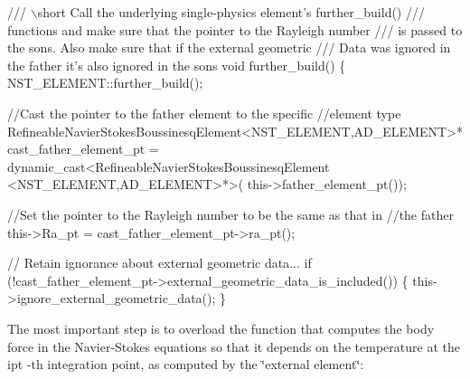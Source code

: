 \begin{DoxyCodeInclude}
  \textcolor{comment}{}
\textcolor{comment}{  /// \(\backslash\)short Call the underlying single-physics element's further\_build()}
\textcolor{comment}{  /// functions and make sure that the pointer to the Rayleigh number}
\textcolor{comment}{  /// is passed to the sons. Also make sure that if the external geometric}
\textcolor{comment}{  /// Data was ignored in the father it's also ignored in the sons}
\textcolor{comment}{}  \textcolor{keywordtype}{void} further\_build()
  \{
   NST\_ELEMENT::further\_build();
   
   \textcolor{comment}{//Cast the pointer to the father element to the specific}
   \textcolor{comment}{//element type}
   RefineableNavierStokesBoussinesqElement<NST\_ELEMENT,AD\_ELEMENT>* 
    cast\_father\_element\_pt
    = \textcolor{keyword}{dynamic\_cast<}RefineableNavierStokesBoussinesqElement
    <NST\_ELEMENT,AD\_ELEMENT\textcolor{keyword}{>}*>(
     this->father\_element\_pt());
   
   \textcolor{comment}{//Set the pointer to the Rayleigh number to be the same as that in}
   \textcolor{comment}{//the father}
   this->Ra\_pt = cast\_father\_element\_pt->ra\_pt();
   
   \textcolor{comment}{// Retain ignorance about external geometric data...}
   \textcolor{keywordflow}{if} (!cast\_father\_element\_pt->external\_geometric\_data\_is\_included())
    \{
     this->ignore\_external\_geometric\_data();
    \}

\end{DoxyCodeInclude}


The most important step is to overload the function that computes the body force in the Navier-\/\+Stokes equations so that it depends on the temperature at the {\ttfamily ipt} -\/th integration point, as computed by the \char`\"{}external element\char`\"{}\+:


